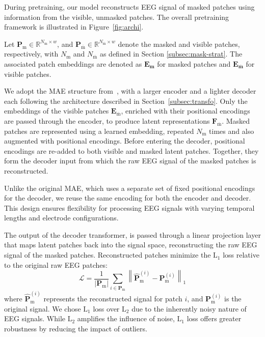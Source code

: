 \documentclass{article}
\newcommand{\bigbar}[1]{\overline{#1}}
\begin{document}
During pretraining, our model reconstructs EEG signal of masked patches using information from the visible, unmasked patches. The overall pretraining framework is illustrated in Figure~\ref{fig:archi}. 

Let $\mathbf{P}_{\text{m}} \in \mathbb{R}^{N_{\text{m}}\times w}$, and $\mathbf{P}_{\bigbar{\text{m}}} \in \mathbb{R}^{N_{\bigbar{\text{m}}} \times w}$ denote the masked and visible patches, respectively, with $N_{\text{m}}$ and $N_{\bigbar{\text{m}}}$ as defined in Section \ref{subsec:mask-strat}. The associated patch embeddings are denoted as $\mathbf{E_m}$ for masked patches and  $\mathbf{E_{\bigbar{m}}}$ for visible patches.


We adopt the MAE structure from~\citet{he2022masked}, with a larger encoder and a lighter decoder each following the architecture described in Section~\ref{subsec:transfo}. Only the embeddings of the visible patches $\mathbf{E}_{\bigbar{\text{m}}}$, enriched with their positional encodings are passed through the encoder, to produce latent representations $\mathbf{F}_{\bigbar{\text{m}}}$. 
Masked patches are represented using a learned embedding, repeated $N_{\text{m}}$ times and also augmented with positional encodings.
Before entering the decoder, positional encodings are re-added to both visible and masked latent patches. Together, they form the decoder input from which the raw EEG signal of the masked patches is reconstructed.

Unlike the original MAE, which uses a separate set of fixed positional encodings for the decoder, we reuse the same encoding for both the encoder and decoder. This design ensures flexibility for processing EEG signals with varying temporal lengths and electrode configurations.

The output of the decoder transformer, is passed through a linear projection layer that maps latent patches back into the signal space, reconstructing the raw EEG signal of the masked patches. Reconstructed patches minimize the $\text{L}_1$ loss relative to the original raw EEG patches:
\begin{equation}
    \mathcal{L} = \frac{1}{|\mathbf{P}_{\text{m}}|} \sum_{i \in \mathbf{P}_{\text{m}}} \left\lVert \mathbf{\hat{P}}_{\text{m}}^{(i)} -\mathbf{P}_{\text{m}}^{(i)} \right\rVert_1
\end{equation}
where $\mathbf{\hat{P}}_{\text{m}}^{(i)}$ represents the reconstructed signal for patch $i$, and $\mathbf{P}_{\text{m}}^{(i)}$ is the original signal. We chose $\text{L}_1$ loss over $\text{L}_2$ due to the inherently noisy nature of EEG signals. While $\text{L}_2$ amplifies the influence of noise, $\text{L}_1$ loss offers greater robustness by reducing the impact of outliers.
\end{document}
